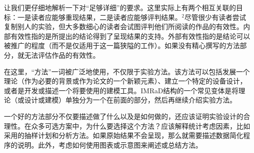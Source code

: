 让我们更仔细地解析一下对“足够详细”的要求。这里实际上有两个相互关联的目标：一是读者应能够重现结果，二是读者应能够评判结果。${ }^{2}$尽管很少有读者尝试复制别人的实验，但大多数细心的读者会试图评判他们所阅读的作品的有效性。内部有效性指的是所提出的结论得到了呈现结果的支持。外部有效性指的是结论可以被推广的程度（而不是仅适用于这一篇狭隘的工作）。如果没有精心撰写的方法部分，就无法评估作品的有效性。

在这里，“方法”一词被广泛地使用，不仅限于实验方法。该方法可以包括发展一个理论（作为必要的背景或作为论文的一个新颖元素）、建立一个特定的设备设计，或者是开发或描述一个将要使用的建模工具。IMRaD结构的一个常见变体是将理论（或设计或建模）单独分为一个在前面的部分，然后再继续介绍实验方法。

一个好的方法部分不仅要描述做了什么以及是如何做的，还应该证明实验设计的合理性。在众多可选方案中，为什么要选择这个方法？应该解释统计考虑因素，比如采用的抽样计划和分析方法。如果原始结果不会呈现，那么就需要描述数据简化程序的说明。此外，考虑如何使用图表或示意图来阐述或总结方法。

